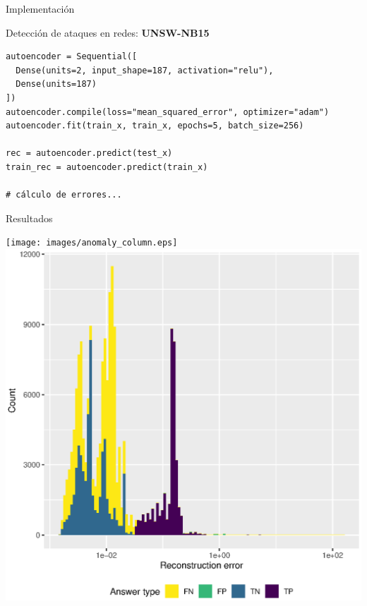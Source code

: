 \documentclass[13.5pt,aspectratio=169]{beamer}
\begin{document}
     \begin{frame}[fragile]{Implementación}

        Detección de ataques en redes: \textbf{\textcolor{colorblue}{UNSW-NB15}}

        \begin{verbatim}
autoencoder = Sequential([
  Dense(units=2, input_shape=187, activation="relu"),
  Dense(units=187)
])
autoencoder.compile(loss="mean_squared_error", optimizer="adam")
autoencoder.fit(train_x, train_x, epochs=5, batch_size=256)

rec = autoencoder.predict(test_x)
train_rec = autoencoder.predict(train_x)

# cálculo de errores...
        \end{verbatim}
        
         
     \end{frame}

     \begin{frame}{Resultados}
        
      \texttt{[image: images/anomaly\_column.eps]}%
      \includegraphics[width=.5\linewidth]{images/anomaly_histogram.eps}
     \end{frame}
\end{document}
